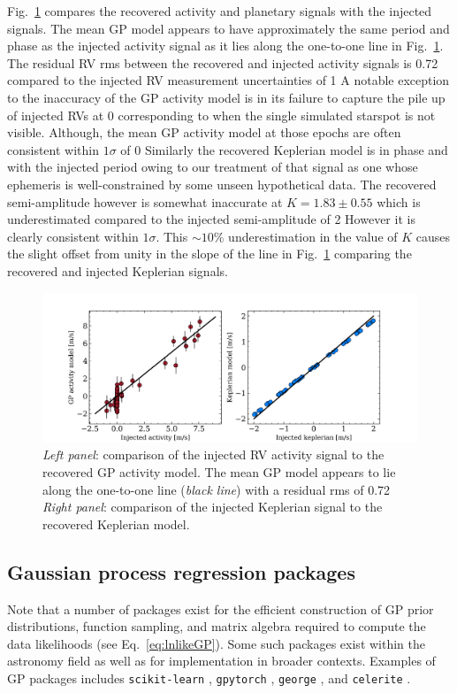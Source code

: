 Fig.~\ref{fig:RVcomp} compares the recovered activity and planetary signals with the injected
signals. The mean GP model appears to have approximately the same period and phase as the injected activity
signal as it lies along the one-to-one line in Fig.~\ref{fig:RVcomp}. The residual RV rms between the
recovered and injected activity signals is 0.72 \mps{} compared to the injected RV measurement uncertainties
of 1  A notable exception to the inaccuracy of the GP activity model is in its failure to
capture the pile up of injected RVs at 0 \mps{} corresponding to when the single simulated starspot is
not visible. Although, the mean GP activity model at those epochs are often consistent within $1\sigma$ of
0  Similarly the recovered Keplerian model is in phase and with the injected period owing to our
treatment of that signal as one whose ephemeris is well-constrained by some unseen hypothetical data.
The recovered semi-amplitude however is somewhat inaccurate at $K=1.83 \pm 0.55$ \mps{} which is underestimated
compared to the injected semi-amplitude of 2  However it is clearly consistent within $1\sigma$.
This $\sim 10$\% underestimation in the value of $K$ causes the slight offset from unity in the slope
of the line in Fig.~\ref{fig:RVcomp} comparing the recovered and injected Keplerian signals.

\begin{figure}
  \centering
  \includegraphics[width=\hsize]{figures/RVcomparison.png}
  \caption[Comparison of injected to recovered RV signals.]
          {\emph{Left panel}: comparison of the injected RV activity signal to the recovered GP activity model.
            The mean GP model appears to lie along the one-to-one line (\emph{black line}) with a residual rms
            of 0.72  \emph{Right panel}:
            comparison of the injected Keplerian signal to the recovered Keplerian model. }
  \label{fig:RVcomp}
\end{figure}


\subsection{Gaussian process regression packages}
Note that a number of packages exist for the efficient construction of GP prior distributions, function
sampling, and matrix algebra required to compute the data likelihoods (see Eq.~\ref{eq:lnlikeGP}).
Some such packages exist within the astronomy field as well as for implementation in broader contexts.
Examples of GP packages includes \texttt{scikit-learn} \citep{sklearn},
\texttt{gpytorch} \citep{gardner18,wang19},
\texttt{george} \citep{ambikasaran14,foremanmackey15b}, and
\texttt{celerite} \citep{foremanmackey17}.


